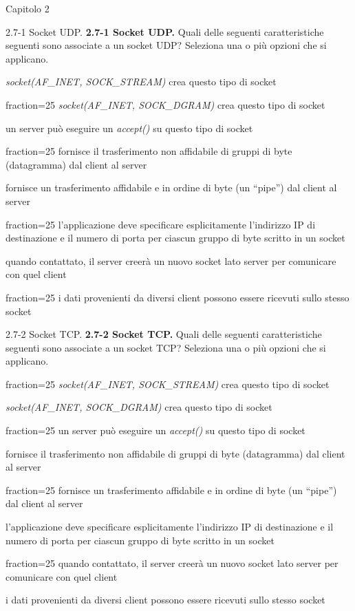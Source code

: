 \documentclass[a4paper]{article}
\begin{document}
\begin{quiz}{Capitolo 2}
\begin{multi}[points=1,shuffle,multiple]{2.7-1 Socket UDP.}
\textbf{2.7-1 Socket UDP.}
Quali delle seguenti caratteristiche seguenti sono associate a un socket UDP? Seleziona una o più opzioni che si applicano.
\item \emph{socket(AF\_INET, SOCK\_STREAM)} crea questo tipo di socket
\item[fraction=25] \emph{socket(AF\_INET, SOCK\_DGRAM)} crea questo tipo di socket
\item un server può eseguire un \emph{accept()} su questo tipo di socket
\item[fraction=25] fornisce il trasferimento non affidabile di gruppi di byte (datagramma) dal client al server
\item fornisce un trasferimento affidabile e in ordine di byte (un ``pipe'') dal client al server
\item[fraction=25] l'applicazione deve specificare esplicitamente l'indirizzo IP di destinazione e il numero di porta per ciascun gruppo di byte scritto in un socket
\item quando contattato, il server creerà un nuovo socket lato server per comunicare con quel client
\item[fraction=25] i dati provenienti da diversi client possono essere ricevuti sullo stesso socket
\end{multi}


\begin{multi}[points=1,shuffle,multiple]{2.7-2 Socket TCP.}
\textbf{2.7-2 Socket TCP.}
Quali delle seguenti caratteristiche seguenti sono associate a un socket TCP? Seleziona una o più opzioni che si applicano.
\item[fraction=25] \emph{socket(AF\_INET, SOCK\_STREAM)} crea questo tipo di socket
\item \emph{socket(AF\_INET, SOCK\_DGRAM)} crea questo tipo di socket
\item[fraction=25] un server può eseguire un \emph{accept()} su questo tipo di socket
\item fornisce il trasferimento non affidabile di gruppi di byte (datagramma) dal client al server
\item[fraction=25] fornisce un trasferimento affidabile e in ordine di byte (un ``pipe'') dal client al server
\item l'applicazione deve specificare esplicitamente l'indirizzo IP di destinazione e il numero di porta per ciascun gruppo di byte scritto in un socket
\item[fraction=25] quando contattato, il server creerà un nuovo socket lato server per comunicare con quel client
\item i dati provenienti da diversi client possono essere ricevuti sullo stesso socket
\end{multi}



\end{quiz}
\end{document}

